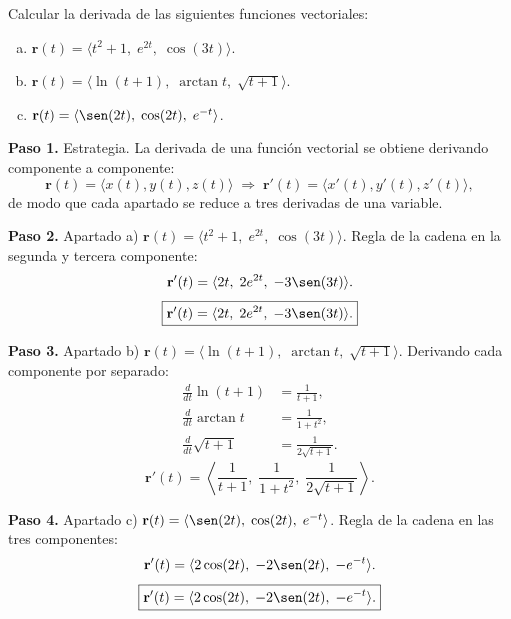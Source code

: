 \begin{prob}
Calcular la derivada de las siguientes funciones vectoriales:
\begin{enumerate}[a)]
  \item $\mathbf{r}(t) = \langle t^2+1,\; e^{2t},\; \cos(3t) \rangle$.
  \item $\mathbf{r}(t) = \langle \ln(t+1),\; \arctan t,\; \sqrt{t+1} \rangle$.
  \item $\mathbf{r}(t) = \langle \sen(2t),\; \cos(2t),\; e^{-t} \rangle$.
\end{enumerate}
\begin{myproof}
\textbf{Paso 1.} Estrategia. La derivada de una función vectorial se obtiene
derivando componente a componente:
\[
  \mathbf{r}(t)=\langle x(t),y(t),z(t)\rangle
  \;\Longrightarrow\;
  \mathbf{r}'(t)=\langle x'(t),y'(t),z'(t)\rangle,
\]
de modo que cada apartado se reduce a tres derivadas de una variable.

\textbf{Paso 2.} Apartado a) $\mathbf{r}(t)=\langle t^2+1,\;e^{2t},\;\cos(3t)\rangle$.
Regla de la cadena en la segunda y tercera componente:
\[
  \mathbf{r}'(t)=\langle 2t,\;2e^{2t},\;-3\sen(3t)\rangle.
\]
\[
  \boxed{\mathbf{r}'(t) = \langle 2t,\;2e^{2t},\;-3\sen(3t)\rangle.}
\]

\textbf{Paso 3.} Apartado b) $\mathbf{r}(t)=\langle \ln(t+1),\;\arctan t,\;\sqrt{t+1}\rangle$.
Derivando cada componente por separado:
\begin{align*}
  \frac{d}{dt}\ln(t+1)   &= \frac{1}{t+1}, \\[4pt]
  \frac{d}{dt}\arctan t  &= \frac{1}{1+t^2}, \\[4pt]
  \frac{d}{dt}\sqrt{t+1} &= \frac{1}{2\sqrt{t+1}}.
\end{align*}
\[
  \boxed{\mathbf{r}'(t) = \left\langle \frac{1}{t+1},\;\frac{1}{1+t^2},\;\frac{1}{2\sqrt{t+1}}\right\rangle.}
\]

\textbf{Paso 4.} Apartado c) $\mathbf{r}(t)=\langle \sen(2t),\;\cos(2t),\;e^{-t}\rangle$.
Regla de la cadena en las tres componentes:
\[
  \mathbf{r}'(t)=\langle 2\cos(2t),\;-2\sen(2t),\;-e^{-t}\rangle.
\]
\[
  \boxed{\mathbf{r}'(t)=\langle 2\cos(2t),\;-2\sen(2t),\;-e^{-t}\rangle.}
\]
\end{myproof}
\end{prob}

